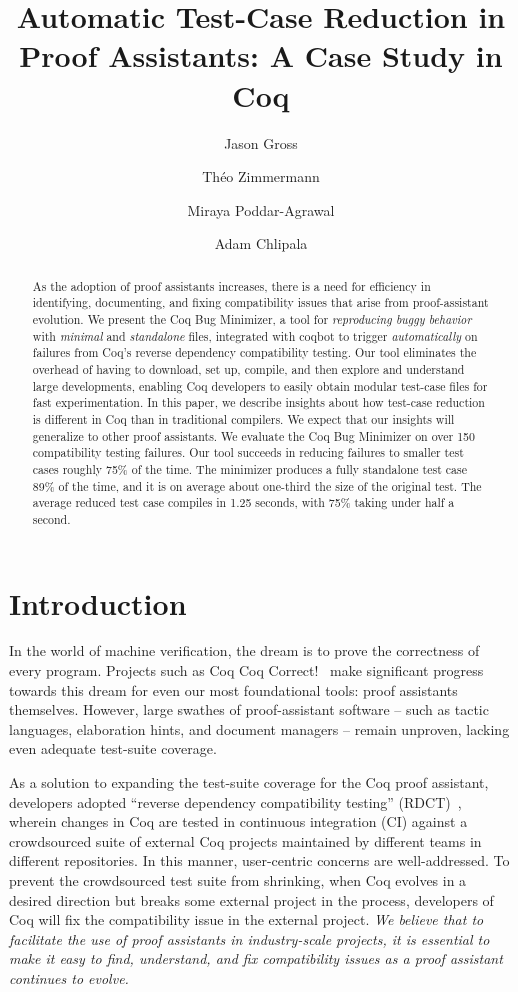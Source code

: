 \documentclass[a4paper,USenglish,cleveref,autoref,thm-restate,pdfa]{lipics-v2021}
\title{Automatic Test-Case Reduction in Proof Assistants: A Case Study in Coq}
\author{Jason Gross}{CSAIL, Massachusetts Institute of Technology, Cambridge, MA, USA \and Machine Intelligence Research Institute, Berkeley, CA, USA \and \url{https://jasongross.github.io/} }{jgross@mit.edu}{https://orcid.org/0000-0002-9427-4891}{}%
\author{Théo Zimmermann}{Inria, Université Paris Cité, CNRS, IRIF, F-75013, Paris, France \and \url{https://www.theozimmermann.net} }{theo@irif.fr}{https://orcid.org/0000-0002-3580-8806}{}
\author{Miraya Poddar-Agrawal}{Reed College, Portland, OR, USA
}{ragrawal@reed.edu}{https://orcid.org/0000-0001-7617-9180}{}
\author{Adam Chlipala}{CSAIL, Massachusetts Institute of Technology, Cambridge, MA, USA \and \url{http://adam.chlipala.net/} }{adamc@csail.mit.edu}{https://orcid.org/0000-0001-7085-9417}{}
\begin{document}
\maketitle

\begin{abstract}
  As the adoption of proof assistants increases, there is a need for efficiency in identifying, documenting, and fixing compatibility issues that arise from proof-assistant evolution.
  We present the Coq Bug Minimizer, a tool for \emph{reproducing buggy behavior} with \emph{minimal} and \emph{standalone} files, integrated with coqbot to trigger \emph{automatically} on failures from Coq's reverse dependency compatibility testing.
  Our tool eliminates the overhead of having to download, set up, compile, and then explore and understand large developments, enabling Coq developers to easily obtain modular test-case files for fast experimentation.
  In this paper, we describe insights about how test-case reduction is different in Coq than in traditional compilers.
We expect that our insights will generalize to other proof assistants.
  We evaluate the Coq Bug Minimizer on over 150 compatibility testing failures.
  Our tool succeeds in reducing failures to smaller test cases roughly 75\% of the time.
  The minimizer produces a fully standalone test case 89\% of the time, and it is on average about one-third the size of the original test.
  The average reduced test case compiles in 1.25 seconds, with 75\% taking under half a second.
\end{abstract}

\section{Introduction}

In the world of machine verification, the dream is to prove the correctness of every program.
Projects such as Coq Coq Correct!~\cite{coq-coq-correct} make significant progress towards this dream for even our most foundational tools: proof assistants themselves.
However, large swathes of proof-assistant software -- such as tactic languages, elaboration hints, and document managers -- remain unproven, lacking even adequate test-suite coverage.

As a solution to expanding the test-suite coverage for the Coq proof assistant, developers adopted ``reverse dependency compatibility testing'' (RDCT)~\cite{ochoa2022breakbot,zimmermann:tel-02451322}, wherein changes in Coq are tested in continuous integration (CI) against a crowdsourced suite of external Coq projects maintained by different teams in different repositories.
In this manner, user-centric concerns are well-addressed.
To prevent the crowdsourced test suite from shrinking, when Coq evolves in a desired direction but breaks some external project in the process, developers of Coq will fix the compatibility issue in the external project.
\emph{We believe that to facilitate the use of proof assistants in industry-scale projects, it is essential to make it easy to find, understand, and fix compatibility issues as a proof assistant continues to evolve.}
\end{document}
